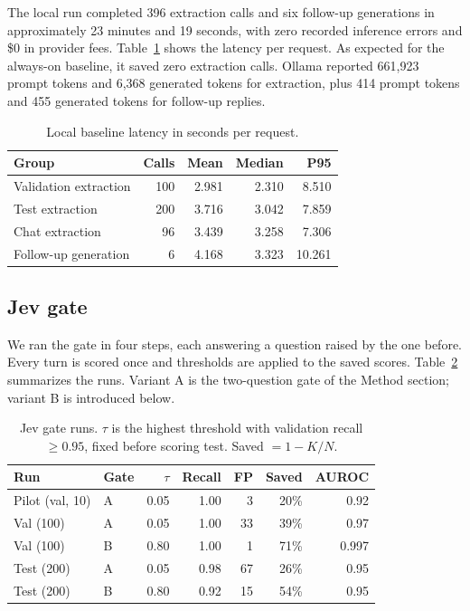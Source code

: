 The local run completed 396 extraction calls and six follow-up generations
in approximately 23 minutes and 19 seconds, with zero recorded inference
errors and \$0 in provider fees. Table~\ref{tab:baseline-latency} shows the
latency per request. As expected for the always-on baseline, it saved zero
extraction calls. Ollama reported 661,923 prompt tokens and 6,368 generated
tokens for extraction, plus 414 prompt tokens and 455 generated tokens for
follow-up replies.

\begin{table}[t]
  \centering
  \small
  \caption{Local baseline latency in seconds per request.}
  \label{tab:baseline-latency}
  \begin{tabular}{@{}lrrrr@{}}
    \toprule
    Group & Calls & Mean & Median & P95 \\
    \midrule
    Validation extraction & 100 & 2.981 & 2.310 & 8.510 \\
    Test extraction & 200 & 3.716 & 3.042 & 7.859 \\
    Chat extraction & 96 & 3.439 & 3.258 & 7.306 \\
    Follow-up generation & 6 & 4.168 & 3.323 & 10.261 \\
    \bottomrule
  \end{tabular}
\end{table}

\subsection{Jev gate}
\label{sec:jev-results}
We ran the gate in four steps, each answering a question raised by the one
before. Every turn is scored once and thresholds are applied to the saved
scores. Table~\ref{tab:jev} summarizes the runs. Variant A is the two-question
gate of the Method section; variant B is introduced below.

\begin{table}[htbp]
  \centering
  \small
  \caption{Jev gate runs. $\tau$ is the highest threshold with validation
  recall $\geq 0.95$, fixed before scoring test. Saved $=1-K/N$.}
  \label{tab:jev}
  \begin{tabular}{llrrrrr}
    \toprule
    Run & Gate & $\tau$ & Recall & FP & Saved & AUROC \\
    \midrule
    Pilot (val, 10)  & A & 0.05 & 1.00 & 3  & 20\% & 0.92 \\
    Val (100)        & A & 0.05 & 1.00 & 33 & 39\% & 0.97 \\
    Val (100)        & B & 0.80 & 1.00 & 1  & 71\% & 0.997 \\
    Test (200)       & A & 0.05 & 0.98 & 67 & 26\% & 0.95 \\
    Test (200)       & B & 0.80 & 0.92 & 15 & 54\% & 0.95 \\
    \bottomrule
  \end{tabular}
\end{table}

